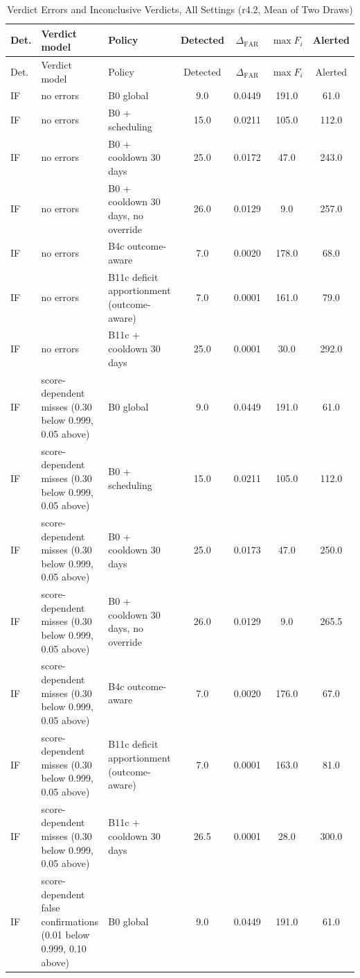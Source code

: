 \documentclass[10pt,onecolumn,letterpaper]{article}
\begin{document}
\begin{longtable}{lp{5.2cm}p{4.4cm}cccc}
\caption{Verdict Errors and Inconclusive Verdicts, All Settings (r4.2, Mean of Two Draws)\label{tab:e-l4-r42}}\\
\toprule
Det. & Verdict model & Policy & Detected & $\Delta_{\mathrm{FAR}}$ & $\max F_i$ & Alerted \\
\midrule
\endfirsthead
\toprule
Det. & Verdict model & Policy & Detected & $\Delta_{\mathrm{FAR}}$ & $\max F_i$ & Alerted \\
\midrule
\endhead
IF & no errors & B0 global & 9.0 & 0.0449 & 191.0 & 61.0 \\
IF & no errors & B0 + scheduling & 15.0 & 0.0211 & 105.0 & 112.0 \\
IF & no errors & B0 + cooldown 30 days & 25.0 & 0.0172 & 47.0 & 243.0 \\
IF & no errors & B0 + cooldown 30 days, no override & 26.0 & 0.0129 & 9.0 & 257.0 \\
IF & no errors & B4c outcome-aware & 7.0 & 0.0020 & 178.0 & 68.0 \\
IF & no errors & B11c deficit apportionment (outcome-aware) & 7.0 & 0.0001 & 161.0 & 79.0 \\
IF & no errors & B11c + cooldown 30 days & 25.0 & 0.0001 & 30.0 & 292.0 \\
IF & score-dependent misses (0.30 below 0.999, 0.05 above) & B0 global & 9.0 & 0.0449 & 191.0 & 61.0 \\
IF & score-dependent misses (0.30 below 0.999, 0.05 above) & B0 + scheduling & 15.0 & 0.0211 & 105.0 & 112.0 \\
IF & score-dependent misses (0.30 below 0.999, 0.05 above) & B0 + cooldown 30 days & 25.0 & 0.0173 & 47.0 & 250.0 \\
IF & score-dependent misses (0.30 below 0.999, 0.05 above) & B0 + cooldown 30 days, no override & 26.0 & 0.0129 & 9.0 & 265.5 \\
IF & score-dependent misses (0.30 below 0.999, 0.05 above) & B4c outcome-aware & 7.0 & 0.0020 & 176.0 & 67.0 \\
IF & score-dependent misses (0.30 below 0.999, 0.05 above) & B11c deficit apportionment (outcome-aware) & 7.0 & 0.0001 & 163.0 & 81.0 \\
IF & score-dependent misses (0.30 below 0.999, 0.05 above) & B11c + cooldown 30 days & 26.5 & 0.0001 & 28.0 & 300.0 \\
IF & score-dependent false confirmations (0.01 below 0.999, 0.10 above) & B0 global & 9.0 & 0.0449 & 191.0 & 61.0 \\

\end{longtable}
\end{document}
